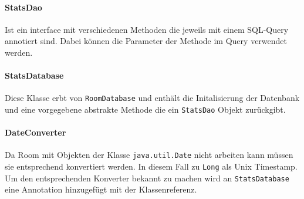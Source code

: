 \paragraph{StatsDao}
Ist ein interface mit verschiedenen Methoden die jeweils mit einem
SQL-Query annotiert sind. Dabei können die Parameter der Methode im Query
verwendet werden.

\paragraph{StatsDatabase}
Diese Klasse erbt von \texttt{RoomDatabase} und enthält die Initalisierung
der Datenbank und eine vorgegebene abstrakte Methode die ein \texttt{StatsDao}
Objekt zurückgibt.

\paragraph{DateConverter}
Da Room mit Objekten der Klasse \texttt{java.util.Date} nicht arbeiten kann
müssen sie entsprechend konvertiert werden. In diesem Fall zu \texttt{Long}
als Unix Timestamp. Um den entsprechenden Konverter bekannt zu machen wird
an \texttt{StatsDatabase} eine Annotation hinzugefügt mit der Klassenreferenz.


